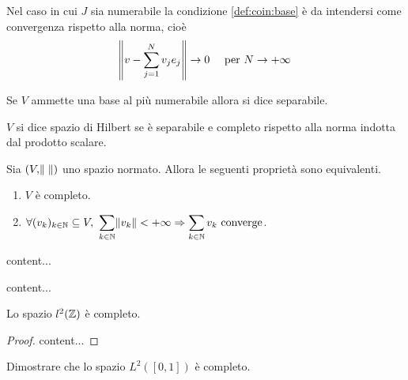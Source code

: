 Nel caso in cui $ J $ sia numerabile la condizione \ref{def:coin:base} è da intendersi come convergenza rispetto alla norma, cioè
\[
    \norm{v - \sum_{j = 1}^{N} v_j e_j} \to 0 \quad \text{ per } N \to +\infty
\]

\begin{definition}
   Se $ V $ ammette una base al più numerabile allora si dice separabile.
\end{definition}

\begin{definition}
    $ V $ si dice spazio di Hilbert se è separabile e completo rispetto alla norma indotta dal prodotto scalare.
\end{definition}

\begin{thm}
    Sia $ (V, \norm{\;}) $ uno spazio normato. Allora le seguenti proprietà sono equivalenti.
    \begin{enumerate}[label=(\roman*)]
        \item $ V $ è completo.
        \item $ \forall (v_k)_{k \in \mathbb{N}} \subseteq V, \ \displaystyle{\sum_{k \in \mathbb{N}} \norm{v_k} < +\infty \Rightarrow \sum_{k \in \mathbb{N}} v_k} \text{ converge} $. 
    \end{enumerate}
\end{thm}

\begin{example}[$ \R^n, \C^n $]
    
\end{example}

\begin{example}[$ L^2 $]
    content...
\end{example}

\begin{example}[$ l^2 $]
    content...
\end{example}

\begin{proposition}
    Lo spazio $ l^2(\mathbb{Z}) $ è completo. 
\end{proposition}
\begin{proof}
    content...
\end{proof}

\begin{exercise}
    Dimostrare che lo spazio $ L^2([0, 1]) $ è completo. 
\end{exercise}
